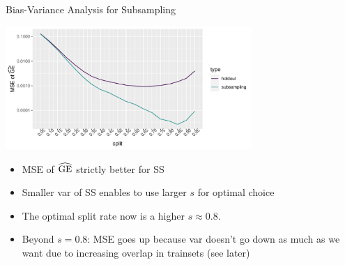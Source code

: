 \begin{vbframe}{Bias-Variance Analysis for Subsampling}

\begin{center}
\includegraphics[width=0.7\textwidth]{figure/eval-resampling-example-2}
\end{center}

\begin{itemize}
  \item MSE of $\widehat{\mathrm{GE}}$ strictly better for SS
  \item Smaller var of SS enables to use larger $s$ for optimal choice
  \item The optimal split rate now is a higher $s \approx 0.8$.
  \item Beyond $s=0.8$: MSE goes up because var doesn't go down as much as we want 
      due to increasing overlap in trainsets (see later)
\end{itemize}

\end{vbframe}





